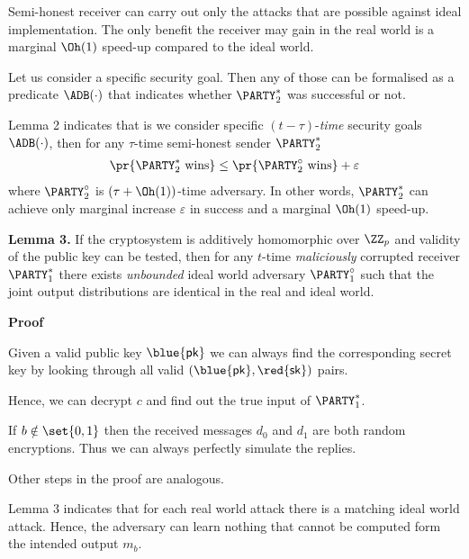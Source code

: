 \documentclass[landscape,dvips,footrule]{foils}
\renewcommand{\SK}{{\red{\mathsf{sk}}}}
\renewcommand{\PK}{{\blue{\mathsf{pk}}}}
\begin{document}

Semi-honest receiver can carry out only the attacks that are possible
against ideal implementation. The only benefit the receiver may gain
in the real world is a marginal $\Oh(1)$ speed-up compared to the
ideal world.

Let us consider a specific security goal. Then any of those can be
formalised as a predicate $\ADB(\cdot)$ that indicates whether
$\PARTY_2^*$ was successful or not.

Lemma 2 indicates that is we consider specific $(t-\tau)$-\emph{time}
security goals $\ADB(\cdot)$, then for any $\tau$-time semi-honest sender
$\PARTY_2^*$
\begin{align*}
  \pr{\PARTY_2^*\text{ wins}}\leq\pr{\PARTY_2^\circ\text{ wins}}+\varepsilon
\end{align*}
where $\PARTY_2^\circ$ is $(\tau+\Oh(1))$-time adversary. In other
words, $\PARTY_2^*$ can achieve only marginal increase $\varepsilon$
in success and a marginal $\Oh(1)$ speed-up.


\textbf{Lemma 3.}  If the cryptosystem is additively homomorphic over
$\ZZ_p$ and validity of the public key can be tested, then for any
$t$-time \emph{maliciously} corrupted receiver $\PARTY_1^*$ there
exists \emph{unbounded} ideal world adversary $\PARTY_1^\circ$ such
that the joint output distributions are identical in the real and
ideal world.

\textbf{Proof}
\begin{triangles}
\item Given a valid public key $\PK$ we can always find the
  corresponding secret key by looking through all valid $(\PK,\SK)$
  pairs.
\item Hence, we can decrypt $c$ and find out the true input of $\PARTY_1^*$.
\item If $b\notin\set{0,1}$ then the received messages $d_0$ and $d_1$
  are both random encryptions. Thus we can always perfectly simulate the replies.
\item Other steps in the proof are analogous.
\end{triangles}


Lemma 3 indicates that for each real world attack there is a matching
ideal world attack. Hence, the adversary can learn nothing that cannot
be computed form the intended output $m_b$.
\end{document}
